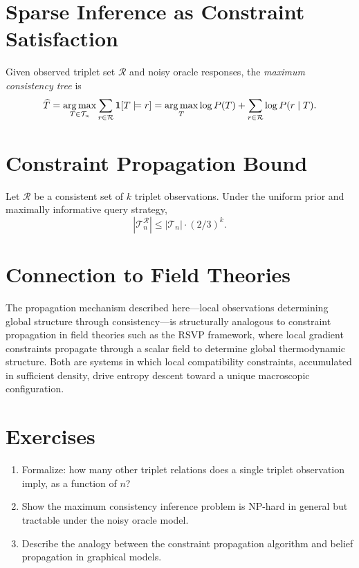 \section{Sparse Inference as Constraint Satisfaction}

\begin{definition}
Given observed triplet set $\mathcal{R}$ and noisy oracle responses, the \emph{maximum consistency tree} is
\[
\widehat{T} = \operatorname*{arg\,max}_{T \in \mathcal{T}_n} \sum_{r \in \mathcal{R}} \mathbf{1}[T \models r]
= \operatorname*{arg\,max}_T \log P(T) + \sum_{r \in \mathcal{R}} \log P(r \mid T).
\]
\end{definition}

\section{Constraint Propagation Bound}

\begin{theorem}
Let $\mathcal{R}$ be a consistent set of $k$ triplet observations. Under the uniform prior and maximally informative query strategy,
\[
|\mathcal{T}_n^{\mathcal{R}}| \leq |\mathcal{T}_n| \cdot (2/3)^k.
\]
\end{theorem}

\section{Connection to Field Theories}

The propagation mechanism described here---local observations determining global structure through consistency---is structurally analogous to constraint propagation in field theories such as the RSVP framework, where local gradient constraints propagate through a scalar field to determine global thermodynamic structure. Both are systems in which local compatibility constraints, accumulated in sufficient density, drive entropy descent toward a unique macroscopic configuration.

\section{Exercises}

\begin{enumerate}
  \item Formalize: how many other triplet relations does a single triplet observation imply, as a function of $n$?
  \item Show the maximum consistency inference problem is NP-hard in general but tractable under the noisy oracle model.
  \item Describe the analogy between the constraint propagation algorithm and belief propagation in graphical models.
\end{enumerate}
